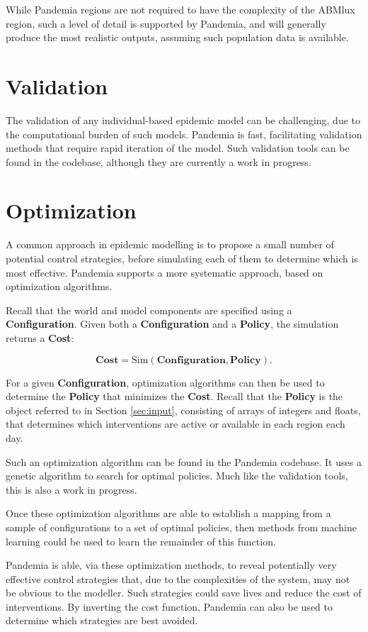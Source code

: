\documentclass[10pt,letterpaper]{article}
\begin{document}
While Pandemia regions are not required to have the complexity of the ABMlux region, such a level of detail is supported by Pandemia, and will generally produce the most realistic outputs, assuming such population data is available.

\section{Validation}

The validation of any individual-based epidemic model can be challenging, due to the computational burden of such models. Pandemia is fast, facilitating validation methods that require rapid iteration of the model. Such validation tools can be found in the codebase, although they are currently a work in progress.

\section{Optimization}

A common approach in epidemic modelling is to propose a small number of potential control strategies, before simulating each of them to determine which is most effective. Pandemia supports a more systematic approach, based on optimization algorithms.

Recall that the world and model components are specified using a \textbf{Configuration}. Given both a \textbf{Configuration} and a \textbf{Policy}, the simulation returns a \textbf{Cost}:

$$\textbf{Cost} = \text{Sim}(\textbf{Configuration}, \textbf{Policy}).$$

For a given \textbf{Configuration}, optimization algorithms can then be used to determine the \textbf{Policy} that minimizes the \textbf{Cost}. Recall that the \textbf{Policy} is the object referred to in Section \ref{sec:input}, consisting of arrays of integers and floats, that determines which interventions are active or available in each region each day.

Such an optimization algorithm can be found in the Pandemia codebase. It uses a genetic algorithm to search for optimal policies. Much like the validation tools, this is also a work in progress.

Once these optimization algorithms are able to establish a mapping from a sample of configurations to a set of optimal policies, then methods from machine learning could be used to learn the remainder of this function.

Pandemia is able, via these optimization methods, to reveal potentially very effective control strategies that, due to the complexities of the system, may not be obvious to the modeller. Such strategies could save lives and reduce the cost of interventions. By inverting the cost function, Pandemia can also be used to determine which strategies are best avoided.

% 
\end{document}

